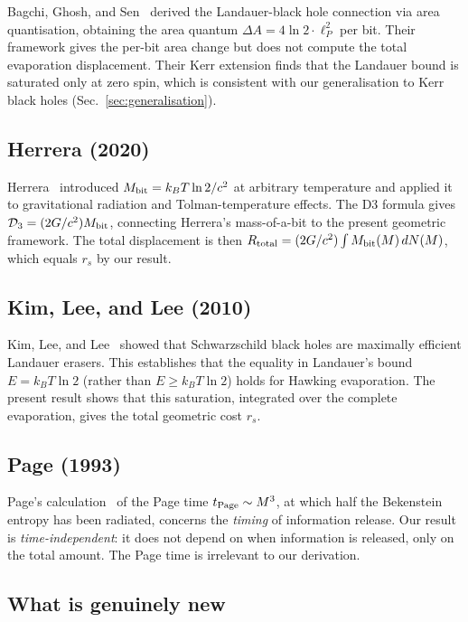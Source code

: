 \documentclass[aps,prd,twocolumn,showpacs,preprintnumbers,amsmath,amssymb,longbibliography]{revtex4-2}
\begin{document}
Bagchi, Ghosh, and Sen~\cite{bagchi2024} derived the Landauer-black hole connection 
via area quantisation, obtaining the area quantum $\Delta A = 4\ln 2 \cdot \ell_P^2$ 
per bit. Their framework gives the per-bit area change but does not compute the total 
evaporation displacement. Their Kerr extension finds that the Landauer bound is 
saturated only at zero spin, which is consistent with our generalisation to Kerr black 
holes (Sec.~\ref{sec:generalisation}).

\subsection{Herrera (2020)}

Herrera~\cite{herrera2020} introduced $M_{\rm bit} = k_B T \ln 2/c^2$ at arbitrary 
temperature and applied it to gravitational radiation and Tolman-temperature effects. 
The D3 formula gives $\mathcal{D}_3 = (2G/c^2) M_{\rm bit}$, connecting Herrera's 
mass-of-a-bit to the present geometric framework. The total displacement is then 
$R_{\rm total} = (2G/c^2) \int M_{\rm bit}(M) \, dN(M)$, which equals $r_s$ by our 
result.

\subsection{Kim, Lee, and Lee (2010)}

Kim, Lee, and Lee~\cite{kim2010} showed that Schwarzschild black holes are maximally 
efficient Landauer erasers. This establishes that the equality in Landauer's bound 
$E = k_B T \ln 2$ (rather than $E \geq k_B T \ln 2$) holds for Hawking evaporation. 
The present result shows that this saturation, integrated over the complete evaporation, 
gives the total geometric cost $r_s$.

\subsection{Page (1993)}

Page's calculation~\cite{page1993} of the Page time $t_{\rm Page} \sim M^3$, at which 
half the Bekenstein entropy has been radiated, concerns the \textit{timing} of 
information release. Our result is \textit{time-independent}: it does not depend on 
when information is released, only on the total amount. The Page time is irrelevant to 
our derivation.

\subsection{What is genuinely new}
\end{document}
